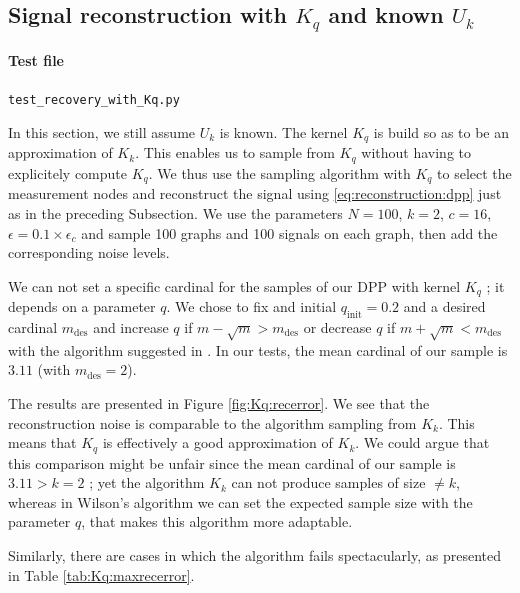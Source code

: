 \documentclass{article}
\begin{document}
\subsection[Signal reconstruction with Kq and known Uk]{Signal reconstruction with $K_q$ and known $U_k$}


\paragraph{Test file} \verb#test_recovery_with_Kq.py#


In this section, we still assume $U_k$ is known. The kernel $K_q$ is build so as to be an approximation of $K_k$. This enables us to sample from $K_q$ without having to explicitely compute $K_q$. We thus use the sampling algorithm with $K_q$ to select the measurement nodes and reconstruct the signal using \eqref{eq:reconstruction:dpp} just as in the preceding Subsection. We use the parameters $N=100$, $k=2$, $c=16$, $\epsilon = 0.1 \times \epsilon_c$ and sample 100 graphs and 100 signals on each graph, then add the corresponding noise levels.


We can not set a specific cardinal for the samples of our DPP with kernel $K_q$ ; it depends on a parameter $q$. We chose to fix and initial $q_\text{init}=0.2$ and a desired cardinal $m_\text{des}$ and increase $q$ if $m - \sqrt{m} > m_\text{des}$ or decrease $q$ if $m + \sqrt{m} < m_\text{des}$ with the algorithm suggested in \cite{avena2013}. In our tests, the mean cardinal of our sample is $3.11$ (with $m_\text{des} = 2$). 


The results are presented in Figure \ref{fig:Kq:recerror}. We see that the reconstruction noise is comparable to the algorithm sampling from $K_k$. This means that $K_q$ is effectively a good approximation of $K_k$. We could argue that this comparison might be unfair since the mean cardinal of our sample is $3.11 > k = 2$ ; yet the algorithm $K_k$ can not produce samples of size $\neq k$, whereas in Wilson's algorithm we can set the expected sample size with the parameter $q$, that makes this algorithm more adaptable. 


Similarly, there are cases in which the algorithm fails spectacularly, as presented in Table \ref{tab:Kq:maxrecerror}.
\end{document}
